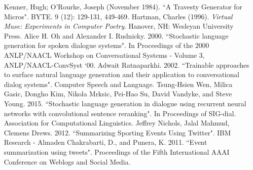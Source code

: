 \documentclass[12pt, journal]{IEEEtran}
\begin{document}



\begin{thebibliography}{9}
Kenner, Hugh; O'Rourke, Joseph (November 1984). ``A Travesty Generator for Micros". BYTE. 9 (12): 129-131, 449-469.
\newline
{}
 Hartman, Charles (1996). \textit{Virtual Muse: Experiments in Computer Poetry}. Hanover, NH: Wesleyan University Press.
\newline
{}
Alice  H. Oh and Alexander  I. Rudnicky. 2000. ``Stochastic language generation for spoken dialogue systems".  In Proceedings of the 2000 ANLP/NAACL Workshop  on Conversational  Systems  -  Volume  3, ANLP/NAACL-ConvSyst `00.
\newline
{}
Adwait Ratnaparkhi. 2002. ``Trainable approaches to surface natural language generation and their application to conversational dialog systems". Computer Speech and Language.
\newline
{}
Tsung-Hsien Wen, Milica Gasic, Dongho Kim, Nikola Mrksic,  Pei-Hao  Su,  David  Vandyke,  and  Steve Young.  2015.  ``Stochastic language generation in dialogue using recurrent neural networks with convolutional sentence reranking".  In Proceedings of SIG-dial. Association for Computational Linguistics.
\newline
{}
Jeffrey Nichols, Jalal Mahmud, Clemens Drews. 2012. ``Summarizing Sporting Events Using Twitter". IBM Research - Almaden
\newline
{}
Chakrabarti, D., and Punera, K. 2011. ``Event summarization using tweets". Proceedings of the Fifth International AAAI Conference on Weblogs and Social Media.

\end{thebibliography}

% 
\end{document}
